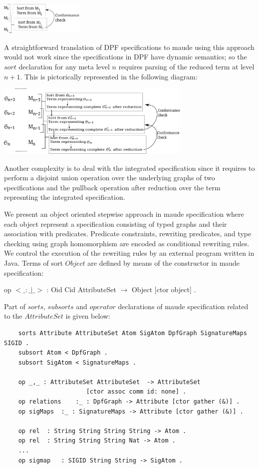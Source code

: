\documentclass{eceasst}
\begin{document}
\begin{center}
\includegraphics[width=0.3\textwidth]{mof.pdf}
\end{center}

A straightforward translation of DPF specifications to maude using this approach would not work since the specifications in DPF have dynamic semantics; 
so the $sort$ declaration for any meta level $n$ requires parsing of the reduced term at level $n+1$.    
This is pictorically represented in the following diagram:

\begin{center}
\includegraphics[width=0.7\textwidth]{mof-dpf.pdf}
\end{center}

Another complexity is to deal with the integrated specification since it requires to perform a disjoint union operation over the underlying graphs of two specifications and the pullback operation 
after reduction over the term represnting the integrated specification. 

We present an object oriented stepwise approach in maude specification where each object represent a specification consisting of typed graphs and their association with predicates. 
Predicate constraints, rewriting predicates, and type checking using graph homomorphism are encoded as conditional rewriting rules. 
We control the execution of the rewriting rules by an external program written in Java. Terms of sort $Object$ are defined by means of the constructor in maude specification:

\begin{center}
 op $<\_:\_|\_>$ : Oid Cid AttributeSet	$\rightarrow$ Object 	[ctor object] .
\end{center}

Part of $sorts$, $subsorts$ and $operator$ declarations of maude specification related to the $AttributeSet$ is given below:

\tiny
\begin{verbatim}
	sorts Attribute AttributeSet Atom SigAtom DpfGraph SignatureMaps SIGID .	
	subsort Atom < DpfGraph .
	subsort SigAtom < SignatureMaps .

	op _,_ : AttributeSet AttributeSet 	-> AttributeSet 
				       [ctor assoc comm id: none] .	
	op relations 	:_ : DpfGraph -> Attribute [ctor gather (&)] .
	op sigMaps 	:_ : SignatureMaps -> Attribute [ctor gather (&)] .
	
	op rel 	: String String String String -> Atom .
	op rel 	: String String String Nat -> Atom .
	...
	op sigmap 	: SIGID String String -> SigAtom .
\end{verbatim}
\normalsize
\end{document}
